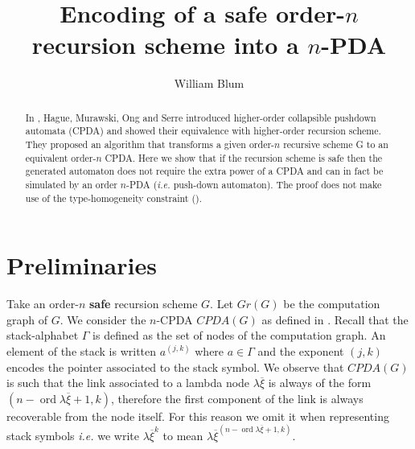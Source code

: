 \documentclass{article}
\author{William Blum}
\title{Encoding of a safe order-$n$ recursion scheme into a $n$-PDA}
\newcommand{\ord}{\mathop{\mathrm{ord}}}
\theoremstyle{remark}
\theoremstyle{definition}
\begin{document}
\maketitle
\begin{abstract}
In \cite{hague-sto07}, Hague, Murawski, Ong and Serre introduced
higher-order collapsible pushdown automata (CPDA) and showed their
equivalence with higher-order recursion scheme. They proposed an
algorithm that transforms a given order-$n$ recursive  scheme G to
an equivalent order-$n$ CPDA. Here we show that if the recursion
scheme is safe then the generated automaton does not require the
extra power of a CPDA and can in fact be simulated by an order
$n$-PDA ({\it i.e.} push-down automaton). The proof does not make
use of the type-homogeneity constraint (\cite{KNU02}).
\end{abstract}


\section{Preliminaries}

Take an order-$n$ {\bf safe} recursion scheme $G$. Let $Gr(G)$ be the computation graph of $G$.
We consider the $n$-CPDA $CPDA(G)$ as defined in \cite[Definition 5.2]{hague-sto07}.
Recall that the stack-alphabet $\Gamma$ is defined as the set of nodes of the computation graph.
An element of the stack is written $a^{(j,k)}$ where $a\in \Gamma$ and the exponent $(j,k)$
encodes the pointer associated to the stack symbol. We observe that $CPDA(G)$ is such that the link associated to a lambda node $\lambda \overline{\xi}$ is always of the form $(n-\ord{\lambda \overline{\xi}}+1, k)$, therefore the first component of the link is always recoverable from the node itself. For this reason we omit it when representing stack symbols {\it i.e.} we write $\lambda \overline{\xi}^{k}$ to mean $\lambda \overline{\xi}^{(n-\ord{\lambda \overline{\xi}}+1,k)}$.
\end{document}
